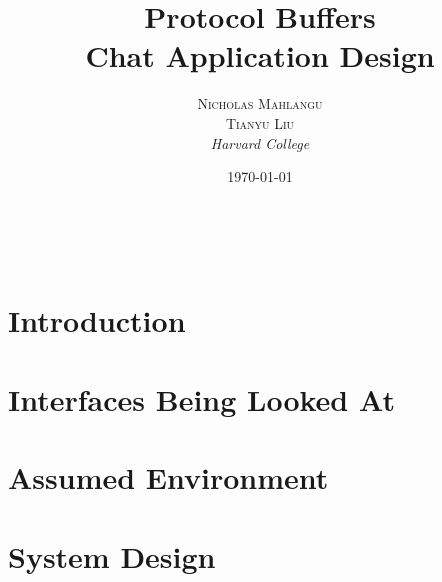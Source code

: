 \documentclass[a4paper, 11pt]{article} %
\title{\textbf{Protocol Buffers}\\ %
Chat Application Design} %
\author{\textsc{Nicholas Mahlangu} %
\\\textsc{Tianyu Liu}
\\{\textit{Harvard College}}} %
\date{\today} %
\makeatletter
\renewcommand{\maketitle}{ %
\begin{flushright} %
{\LARGE\@title} %

\vspace{50pt} %

{\large\@author} %
\\\@date %

\vspace{40pt} %
\end{flushright}
}
\makeatother
\begin{document}
\maketitle %



%
%


\section*{Introduction}

\section*{Interfaces Being Looked At}

\section*{Assumed Environment}

\section*{System Design}
\end{document}
